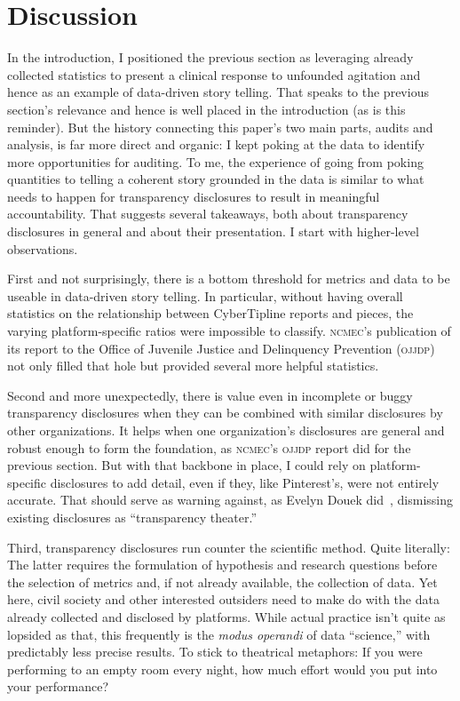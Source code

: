 \documentclass[nonacm,screen]{acmart}
\newcommand\V[1]{\textsc{\MakeLowercase{#1}}}
\begin{document}

\section{Discussion}
\label{sec:discussion}

In the introduction, I positioned the previous section as leveraging already
collected statistics to present a clinical response to unfounded agitation and
hence as an example of data-driven story telling. That speaks to the previous
section's relevance and hence is well placed in the introduction (as is this
reminder). But the history connecting this paper's two main parts, audits and
analysis, is far more direct and organic: I kept poking at the data to identify
more opportunities for auditing. To me, the experience of going from poking
quantities to telling a coherent story grounded in the data is similar to what
needs to happen for transparency disclosures to result in meaningful
accountability. That suggests several takeaways, both about transparency
disclosures in general and about their presentation. I start with higher-level
observations.

First and not surprisingly, there is a bottom threshold for metrics and data to
be useable in data-driven story telling. In particular, without having overall
statistics on the relationship between CyberTipline reports and pieces, the
varying platform-specific ratios were impossible to classify. \V{NCMEC}'s
publication of its report to the Office of Juvenile Justice and Delinquency
Prevention (\V{OJJDP}) not only filled that hole but provided several more
helpful statistics.

Second and more unexpectedly, there is value even in incomplete or buggy
transparency disclosures when they can be combined with similar disclosures by
other organizations. It helps when one organization's disclosures are general
and robust enough to form the foundation, as \V{NCMEC}'s \V{OJJDP} report did
for the previous section. But with that backbone in place, I could rely on
platform-specific disclosures to add detail, even if they, like Pinterest's,
were not entirely accurate. That should serve as warning against, as Evelyn
Douek did~\cite{Douek2022}, dismissing existing disclosures as ``transparency
theater.''

Third, transparency disclosures run counter the scientific method. Quite
literally: The latter requires the formulation of hypothesis and research
questions before the selection of metrics and, if not already available, the
collection of data. Yet here, civil society and other interested outsiders need
to make do with the data already collected and disclosed by platforms. While
actual practice isn't quite as lopsided as that, this frequently is the
\emph{modus operandi} of data ``science,'' with predictably less precise
results. To stick to theatrical metaphors: If you were performing to an empty
room every night, how much effort would you put into your performance?
\end{document}
